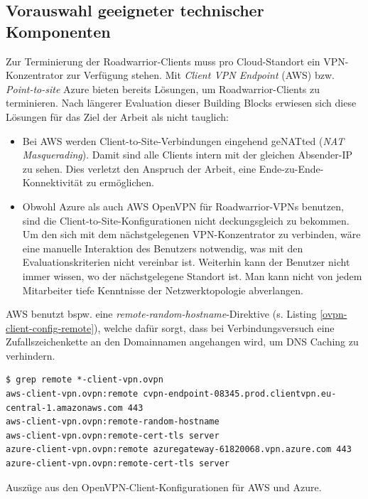 \subsection{Vorauswahl geeigneter technischer Komponenten}\label{uc1-vorauswahl}
Zur Terminierung der \gls{Roadwarrior}-\gls{Client}s muss pro Cloud-Standort ein \gls{VPN-Konzentrator} zur Verfügung stehen. Mit \textit{\gls{Client} \gls{VPN} Endpoint} (AWS) bzw. \textit{Point-to-site} Azure bieten bereits Lösungen, um \gls{Roadwarrior}-\gls{Client}s zu terminieren. Nach längerer Evaluation dieser Building Blocks erwiesen sich diese Lösungen für das Ziel der Arbeit als nicht tauglich:
\begin{itemize}
\item Bei AWS werden \gls{Client-to-Site}-Verbindungen eingehend ge\gls{NAT}ted (\textit{NAT Masquerading}). Damit sind alle \gls{Client}s intern mit der gleichen Absender-IP zu sehen. Dies verletzt den Anspruch der Arbeit, eine Ende-zu-Ende-Konnektivität zu ermöglichen.
\item Obwohl Azure als auch AWS OpenVPN für \gls{Roadwarrior}-\gls{VPN}s benutzen, sind die \gls{Client-to-Site}-Konfigurationen nicht \glqq deckungsgleich\grqq{} zu bekommen. Um den sich mit dem nächstgelegenen \gls{VPN-Konzentrator} zu verbinden, wäre eine manuelle Interaktion des Benutzers notwendig, was mit den Evaluationskriterien nicht vereinbar ist. Weiterhin kann der Benutzer nicht immer wissen, wo der nächstgelegene Standort ist. Man kann nicht von jedem Mitarbeiter tiefe Kenntnisse der Netzwerktopologie abverlangen.
\end{itemize}
AWS benutzt bspw. eine \textit{remote-random-hostname}-Direktive (s. Listing \ref{ovpn-client-config-remote}), welche dafür sorgt, dass bei Verbindungsversuch eine Zufallszeichenkette an den Domainnamen angehangen wird, um \gls{DNS} Caching zu verhindern.
\begin{listing}[h]
\begin{verbatim}
$ grep remote *-client-vpn.ovpn
aws-client-vpn.ovpn:remote cvpn-endpoint-08345.prod.clientvpn.eu-central-1.amazonaws.com 443
aws-client-vpn.ovpn:remote-random-hostname
aws-client-vpn.ovpn:remote-cert-tls server
azure-client-vpn.ovpn:remote azuregateway-61820068.vpn.azure.com 443
azure-client-vpn.ovpn:remote-cert-tls server

\end{verbatim}
\caption{Auszüge aus den OpenVPN-Client-Konfigurationen für AWS und Azure.}
\label{ovpn-client-config-remote}
\end{listing}\FloatBarrier
